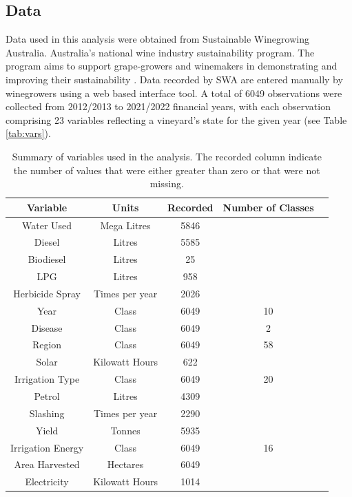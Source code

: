 \documentclass[review,12pt,authoryear]{elsarticle}
\begin{document}
\begin{linenumbers}
\subsection{Data}\label{Data}
% 
Data used in this analysis were obtained from Sustainable Winegrowing Australia. Australia's national wine industry sustainability program. The program aims to support grape-growers and winemakers in demonstrating and improving their sustainability \citep{swaSustainableWingrowingAustralia2022}. Data recorded by SWA are entered manually by winegrowers using a web based interface tool. A total of 6049 observations were collected from 2012/2013 to 2021/2022 financial years, with each observation comprising 23 variables reflecting a vineyard's state for the given year (see Table \ref{tab:vars}). 
\par
\begin{table}[] 
 \label{tab:vars}
 \caption{Summary of variables used in the analysis. The recorded column indicate the number of values that were either greater than zero or that were not missing.}\label{tab:summary}
 \small
 \begin{tabular}{@{}ccccl@{}}
  \toprule
  \textbf{Variable} & \textbf{Units} & \textbf{Recorded} & \textbf{Number of Classes} & \\ \midrule
  Water Used & Mega Litres & 5846 & & \\
  Diesel & Litres & 5585 & & \\
  Biodiesel & Litres & 25 & & \\
  LPG & Litres & 958 & & \\
  Herbicide Spray & Times per year & 2026 & & \\
  Year & Class & 6049 & 10 & \\
  Disease & Class & 6049 & 2 & \\
  Region & Class & 6049 & 58 & \\
  Solar & Kilowatt Hours & 622 & & \\
  Irrigation Type & Class & 6049 & 20 & \\
  Petrol & Litres & 4309 & & \\
  Slashing & Times per year & 2290 & & \\
  Yield & Tonnes & 5935 & & \\
  Irrigation Energy & Class & 6049 & 16 & \\
  Area Harvested & Hectares & 6049 & & \\
  Electricity & Kilowatt Hours & 1014 & & \\

\end{tabular}
\end{table}
\end{linenumbers}
\end{document}
